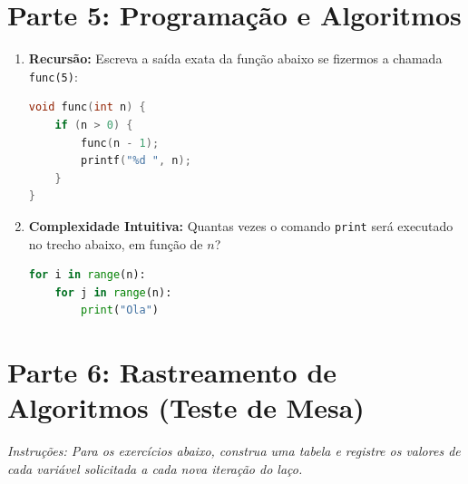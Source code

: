 \documentclass[10pt,a4paper]{article}
\begin{document}
\section*{Parte 5: Programação e Algoritmos}
\begin{enumerate}[leftmargin=*, itemsep=2pt, parsep=0pt, resume]
    \item \textbf{Recursão:} Escreva a saída exata da função abaixo se fizermos a chamada \texttt{func(5)}:
\begin{lstlisting}[language=C]
void func(int n) {
    if (n > 0) {
        func(n - 1);
        printf("%d ", n);
    }
}
\end{lstlisting}
    \item \textbf{Complexidade Intuitiva:} Quantas vezes o comando \texttt{print} será executado no trecho abaixo, em função de $n$?
\begin{lstlisting}[language=Python]
for i in range(n):
    for j in range(n):
        print("Ola")
\end{lstlisting}
\end{enumerate}


\section*{Parte 6: Rastreamento de Algoritmos (Teste de Mesa)}
\textit{Instruções: Para os exercícios abaixo, construa uma tabela e registre os valores de cada variável solicitada a cada nova iteração do laço.}
\end{document}
